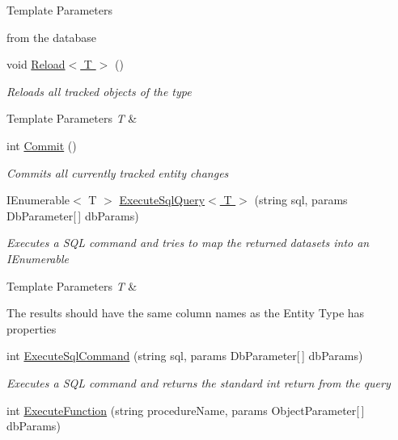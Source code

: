 \begin{DoxyCompactItemize}
\begin{DoxyCompactList}
\begin{DoxyTemplParams}{Template Parameters}
\end{DoxyTemplParams}
from the database \end{DoxyCompactList}\item 
void \hyperlink{class_framework_extension_1_1_entity_framework_1_1_tests_1_1_unit_tests_1_1_commit_events_mock_context_a0f247fc4a425272b9d8383cf4896c57c}{Reload$<$ T $>$} ()
\begin{DoxyCompactList}\small\item\em Reloads all tracked objects of the type 
\begin{DoxyTemplParams}{Template Parameters}
{\em T} & \\
\hline
\end{DoxyTemplParams}
\end{DoxyCompactList}\item 
int \hyperlink{class_framework_extension_1_1_entity_framework_1_1_tests_1_1_unit_tests_1_1_commit_events_mock_context_ace62a54842544297557b5ce7a089eb06}{Commit} ()
\begin{DoxyCompactList}\small\item\em Commits all currently tracked entity changes \end{DoxyCompactList}\item 
I\-Enumerable$<$ T $>$ \hyperlink{class_framework_extension_1_1_entity_framework_1_1_tests_1_1_unit_tests_1_1_commit_events_mock_context_a2fd113b93107d60e3ee6832f83741470}{Execute\-Sql\-Query$<$ T $>$} (string sql, params Db\-Parameter\mbox{[}$\,$\mbox{]} db\-Params)
\begin{DoxyCompactList}\small\item\em Executes a S\-Q\-L command and tries to map the returned datasets into an I\-Enumerable
\begin{DoxyTemplParams}{Template Parameters}
{\em T} & \\
\hline
\end{DoxyTemplParams}
The results should have the same column names as the Entity Type has properties \end{DoxyCompactList}\item 
int \hyperlink{class_framework_extension_1_1_entity_framework_1_1_tests_1_1_unit_tests_1_1_commit_events_mock_context_a32fbc6ee30ba43a4348efe2c01d8e20e}{Execute\-Sql\-Command} (string sql, params Db\-Parameter\mbox{[}$\,$\mbox{]} db\-Params)
\begin{DoxyCompactList}\small\item\em Executes a S\-Q\-L command and returns the standard int return from the query \end{DoxyCompactList}\item 
int \hyperlink{class_framework_extension_1_1_entity_framework_1_1_tests_1_1_unit_tests_1_1_commit_events_mock_context_a5fd5f0739acab5d130069397812906ab}{Execute\-Function} (string procedure\-Name, params Object\-Parameter\mbox{[}$\,$\mbox{]} db\-Params)
\begin{DoxyCompactList}\small\item\em \end{DoxyCompactList}\end{DoxyCompactItemize}
